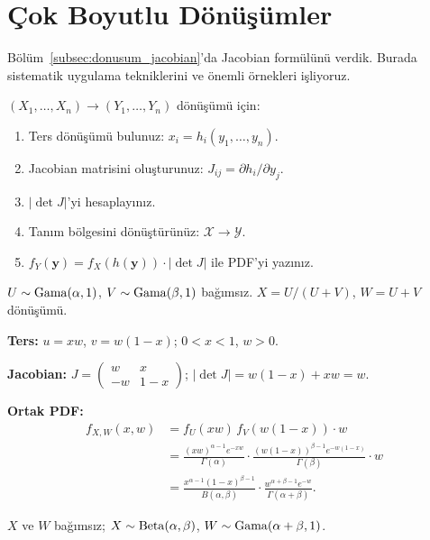 \section{Çok Boyutlu Dönüşümler}
\label{sec:cok_boyut_donusum}

Bölüm~\ref{subsec:donusum_jacobian}'da Jacobian formülünü verdik.
Burada sistematik uygulama tekniklerini ve önemli örnekleri işliyoruz.

\begin{onerme}
\label{prop:jacobian_adim}
$(X_1, \ldots, X_n) \to (Y_1, \ldots, Y_n)$ dönüşümü için:
\begin{enumerate}[(1)]
  \item Ters dönüşümü bulunuz: $x_i = h_i(y_1,\ldots,y_n)$.
  \item Jacobian matrisini oluşturunuz: $J_{ij} = \partial h_i/\partial y_j$.
  \item $|\det J|$'yi hesaplayınız.
  \item Tanım bölgesini dönüştürünüz: $\mathcal{X} \to \mathcal{Y}$.
  \item $f_Y(\mathbf{y}) = f_X(h(\mathbf{y})) \cdot |\det J|$ ile PDF'yi yazınız.
\end{enumerate}
\end{onerme}

\begin{ornek}
\label{ex:beta_gama_turetme}
$U \sim \operatorname{Gama}(\alpha, 1)$, $V \sim \operatorname{Gama}(\beta, 1)$ bağımsız.
$X = U/(U+V)$, $W = U+V$ dönüşümü.

\textbf{Ters:} $u = xw$, $v = w(1-x)$; $0 < x < 1$, $w > 0$.

\textbf{Jacobian:}
$J = \begin{pmatrix} w & x \\ -w & 1-x \end{pmatrix}$; $|\det J| = w(1-x) + xw = w$.

\textbf{Ortak PDF:}
\begin{align*}
  f_{X,W}(x,w) &= f_U(xw)\,f_V(w(1-x))\cdot w \\
  &= \frac{(xw)^{\alpha-1}e^{-xw}}{\Gamma(\alpha)} \cdot \frac{(w(1-x))^{\beta-1}e^{-w(1-x)}}{\Gamma(\beta)} \cdot w \\
  &= \frac{x^{\alpha-1}(1-x)^{\beta-1}}{B(\alpha,\beta)} \cdot \frac{w^{\alpha+\beta-1}e^{-w}}{\Gamma(\alpha+\beta)}.
\end{align*}

$X$ ve $W$ bağımsız; $X \sim \operatorname{Beta}(\alpha,\beta)$, $W \sim \operatorname{Gama}(\alpha+\beta, 1)$.
\end{ornek}

